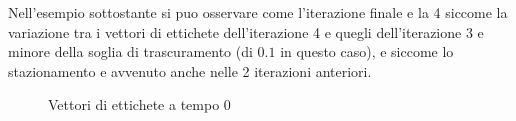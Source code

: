 \documentclass[a4paper,12pt]{report}
\begin{document}
		Nell'esempio sottostante si puo osservare come l'iterazione finale e la 4 siccome la variazione tra i vettori di ettichete dell'iterazione 4 e quegli dell'iterazione 3 e minore della soglia di trascuramento (di $0.1$ in questo caso), e siccome lo stazionamento e avvenuto anche nelle 2 iterazioni anteriori.
		\begin{center}
			\begin{figure}[H]
				\centering
				\qquad
				\qquad
				\qquad

				\caption{Vettori di ettichete a tempo 0}
			\end{figure}
		\end{center}
\end{document}
